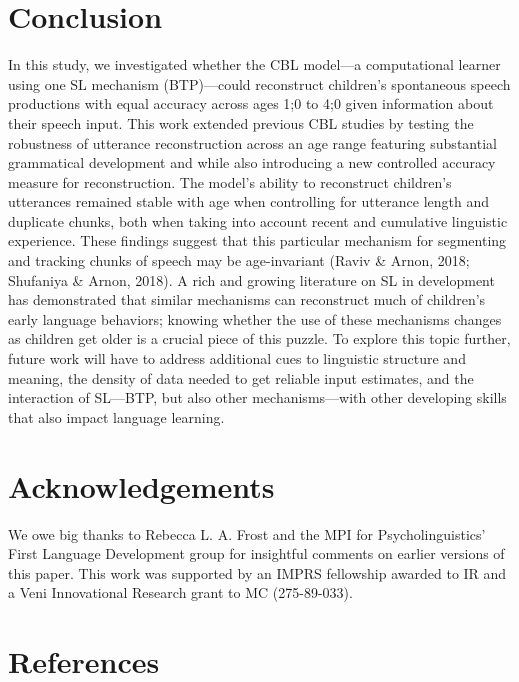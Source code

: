 \documentclass[
  english,
  man,floatsintext]{apa6}
\begin{document}
\hypertarget{conclusion}{%
\section{Conclusion}\label{conclusion}}

In this study, we investigated whether the CBL model---a computational learner using one SL mechanism (BTP)---could reconstruct children's spontaneous speech productions with equal accuracy across ages 1;0 to 4;0 given information about their speech input. This work extended previous CBL studies by testing the robustness of utterance reconstruction across an age range featuring substantial grammatical development and while also introducing a new controlled accuracy measure for reconstruction. The model's ability to reconstruct children's utterances remained stable with age when controlling for utterance length and duplicate chunks, both when taking into account recent and cumulative linguistic experience. These findings suggest that this particular mechanism for segmenting and tracking chunks of speech may be age-invariant (Raviv \& Arnon, 2018; Shufaniya \& Arnon, 2018). A rich and growing literature on SL in development has demonstrated that similar mechanisms can reconstruct much of children's early language behaviors; knowing whether the use of these mechanisms changes as children get older is a crucial piece of this puzzle. To explore this topic further, future work will have to address additional cues to linguistic structure and meaning, the density of data needed to get reliable input estimates, and the interaction of SL---BTP, but also other mechanisms---with other developing skills that also impact language learning.

\hypertarget{acknowledgements}{%
\section{Acknowledgements}\label{acknowledgements}}

We owe big thanks to Rebecca L. A. Frost and the MPI for Psycholinguistics' First Language Development group for insightful comments on earlier versions of this paper. This work was supported by an IMPRS fellowship awarded to IR and a Veni Innovational Research grant to MC (275-89-033).

\newpage

\hypertarget{references}{%
\section{References}\label{references}}
\end{document}
